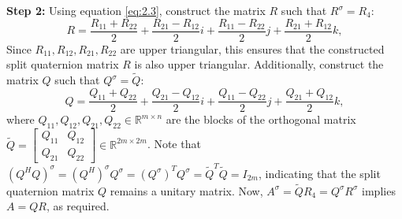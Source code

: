 \documentclass[3p]{elsarticle}
\numberwithin{equation}{section}
\begin{document}
\textbf{Step 2:} Using equation \eqref{eq:2.3}, construct the matrix $R$ such that $R^\sigma=R_4:$
\begin{equation*}
R = \frac{R_{11} + R_{22}}{2} + \frac{R_{21} - R_{12}}{2}i + \frac{R_{11} - R_{22}}{2}j + \frac{R_{21} + R_{12}}{2}k,
\end{equation*}
Since $R_{11}, R_{12}, R_{21}, R_{22}$ are upper triangular, this ensures that the constructed split quaternion matrix $R$ is also upper triangular. Additionally, construct the matrix $Q$ such that $Q^\sigma=\widetilde{Q}:$
\begin{equation*}
Q = \frac{Q_{11} + Q_{22}}{2} + \frac{Q_{21} - Q_{12}}{2}i + \frac{Q_{11} - Q_{22}}{2}j + \frac{Q_{21} + Q_{12}}{2}k,
\end{equation*}
where $Q_{11}, Q_{12}, Q_{21}, Q_{22} \in \mathbb{R}^{m \times n}$ are the blocks of the orthogonal matrix $\widetilde{Q} = \begin{bmatrix} Q_{11} & Q_{12} \\ Q_{21} & Q_{22} \end{bmatrix} \in \mathbb{R}^{2m \times 2m}$. Note that $(Q^H Q)^\sigma = {(Q^H)}^\sigma Q^\sigma = {(Q^\sigma)}^TQ^\sigma = \widetilde{Q}^T\widetilde{Q} = I_{2m}$, indicating that the split quaternion matrix $Q$ remains a unitary matrix.
Now, $A^\sigma=\widetilde{Q}R_4=Q^\sigma R^\sigma$ implies
$A = Q R$, as required.
 
\end{document}
